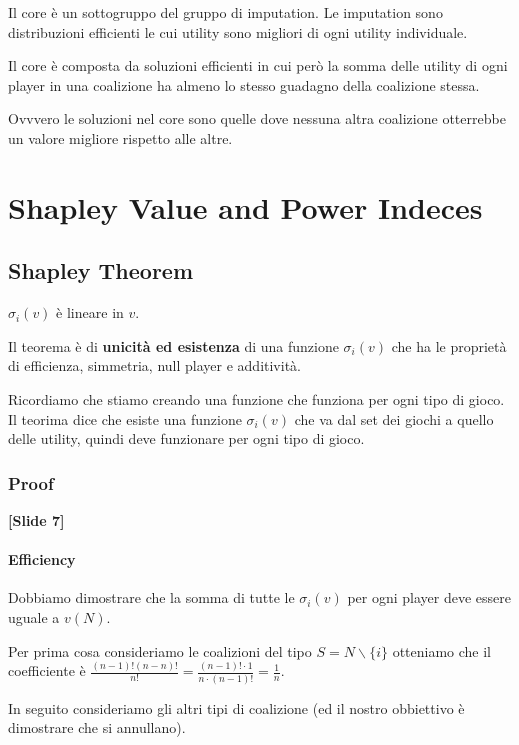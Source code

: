 \documentclass[10pt,a4paper]{report}
\begin{document}
        Il core è un sottogruppo del gruppo di imputation. Le imputation sono distribuzioni efficienti le cui utility sono migliori di ogni utility individuale. 
        
        Il core è composta da soluzioni efficienti in cui però la somma delle utility di ogni player in una coalizione ha almeno lo stesso guadagno della coalizione stessa.

        Ovvvero le soluzioni nel core sono quelle dove nessuna altra coalizione otterrebbe un valore migliore rispetto alle altre.


        \chapter{Shapley Value and Power Indeces}

        \section{Shapley Theorem}
        $\sigma_i(v)$ è lineare in $v$.

        Il teorema è di \textbf{unicità ed esistenza} di una funzione $\sigma_i(v)$ che ha le proprietà di efficienza, simmetria, null player e additività.

        Ricordiamo che stiamo creando una funzione che funziona per ogni tipo di gioco. Il teorima dice che esiste una funzione $\sigma_i(v)$ che va dal set dei giochi a quello delle utility, quindi deve funzionare per ogni tipo di gioco.

        \subsection{Proof}

        \textbf{[Slide 7]}

        \subsubsection{Efficiency}

        Dobbiamo dimostrare che la somma di tutte le $\sigma_i(v)$ per ogni player deve essere uguale a $v(N)$.

        Per prima cosa consideriamo le coalizioni del tipo $S = N \backslash \{i\}$ otteniamo che il coefficiente è $\frac{(n-1)!(n-n)!}{n!} = \frac{(n-1)! \cdot 1}{n \cdot (n-1)!} = \frac{1}{n}$. 
        
        In seguito consideriamo gli altri tipi di coalizione (ed il nostro obbiettivo è dimostrare che si annullano).
\end{document}
